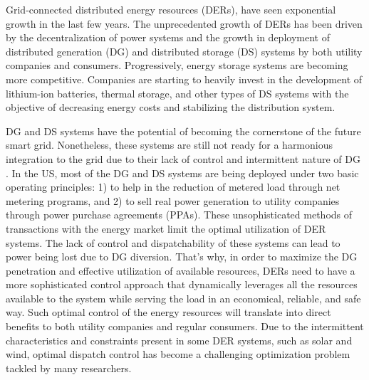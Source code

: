 Grid-connected distributed energy resources (DERs), have seen exponential growth in the last few years. The unprecedented growth of DERs has been driven by the decentralization of power systems and the growth in deployment of distributed generation (DG) and distributed storage (DS) systems by both utility companies and consumers. Progressively, energy storage systems are becoming more competitive. Companies are starting to heavily invest in the development of lithium-ion batteries, thermal storage, and other types of DS systems with the objective of decreasing energy costs and stabilizing the distribution system. 

DG and DS systems have the potential of becoming the cornerstone of the future smart grid. Nonetheless, these systems are still not ready for a harmonious integration to the grid due to their lack of control and intermittent nature of DG \cite{denholm2016path}. In the US, most of the DG and DS systems are being deployed under two basic operating principles: 1) to help in the reduction of metered load through net metering programs, and 2) to sell real power generation to utility companies through power purchase agreements (PPAs). These unsophisticated methods of transactions with the energy market limit the optimal utilization of DER systems. The lack of control and dispatchability of these systems can lead to power being lost due to DG diversion. That's why, in order to maximize the DG penetration and effective utilization of available resources, DERs need to have a more sophisticated control approach that dynamically leverages all the resources available to the system while serving the load in an economical, reliable, and safe way. Such optimal control of the energy resources will translate into direct benefits to both utility companies and regular consumers. Due to the intermittent characteristics and constraints present in some DER systems, such as solar and wind, optimal dispatch control has become a challenging optimization problem tackled by many researchers.

